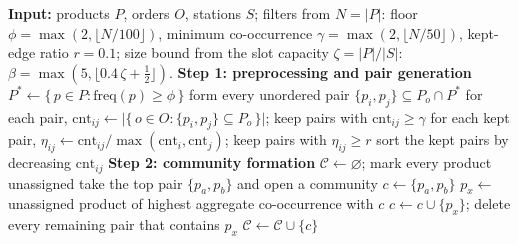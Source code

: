 \documentclass[]{interact}
\begin{document}
\begin{algorithm}[H]
\caption{Greedy product clustering and station assignment}
\label{alg:heuristic}
\begin{algorithmic}[1]
\State \textbf{Input:} products $P$, orders $O$, stations $S$; filters from $N=|P|$: floor $\phi=\max(2,\lfloor N/100\rfloor)$, minimum co-occurrence $\gamma=\max(2,\lfloor N/50\rfloor)$, kept-edge ratio $r=0.1$; size bound from the slot capacity $\zeta=|P|/|S|$: $\beta=\max(5,\lfloor 0.4\,\zeta+\tfrac12\rfloor)$.
\Statex
\State \textbf{Step 1: preprocessing and pair generation}
\State $P^{\ast}\gets\{\,p\in P:\mathrm{freq}(p)\ge\phi\,\}$ %
  \State form every unordered pair $\{p_i,p_j\}\subseteq P_o\cap P^{\ast}$
\EndFor
\State for each pair, $\mathrm{cnt}_{ij}\gets\lvert\{\,o\in O:\{p_i,p_j\}\subseteq P_o\,\}\rvert$; keep pairs with $\mathrm{cnt}_{ij}\ge\gamma$
\State for each kept pair, $\eta_{ij}\gets\mathrm{cnt}_{ij}/\max(\mathrm{cnt}_i,\mathrm{cnt}_j)$; keep pairs with $\eta_{ij}\ge r$
\State sort the kept pairs by decreasing $\mathrm{cnt}_{ij}$
\Statex
\State \textbf{Step 2: community formation}
\State $\mathcal{C}\gets\varnothing$; mark every product unassigned
  \State take the top pair $\{p_a,p_b\}$ and open a community $c\gets\{p_a,p_b\}$
    \State $p_x\gets$ unassigned product of highest aggregate co-occurrence with $c$
    \State $c\gets c\cup\{p_x\}$; delete every remaining pair that contains $p_x$
  \EndWhile
  \State $\mathcal{C}\gets\mathcal{C}\cup\{c\}$
\EndWhile

\end{algorithmic}
\end{algorithm}
\end{document}
